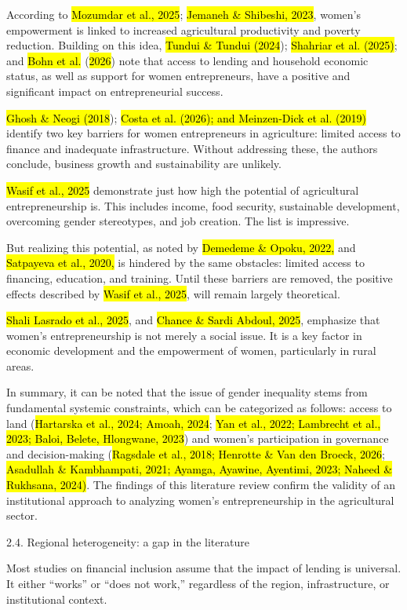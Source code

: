 \documentclass[
]{article}
\begin{document}
According to \hl{Mozumdar et al., 2025}; \hl{Jemaneh \& Shibeshi, 2023},
women's empowerment is linked to increased agricultural productivity and
poverty reduction. Building on this idea, \hl{Tundui \& Tundui (2024});
\hl{Shahriar et al. (2025)}; and \hl{Bohn et al.} (\hl{2026}) note that
access to lending and household economic status, as well as support for
women entrepreneurs, have a positive and significant impact on
entrepreneurial success.

\hl{Ghosh \& Neogi (2018}); \hl{Costa et al. (2026); and Meinzen-Dick et
al. (2019)} identify two key barriers for women entrepreneurs in
agriculture: limited access to finance and inadequate infrastructure.
Without addressing these, the authors conclude, business growth and
sustainability are unlikely.

\hl{Wasif et al., 2025} demonstrate just how high the potential of
agricultural entrepreneurship is. This includes income, food security,
sustainable development, overcoming gender stereotypes, and job
creation. The list is impressive.

But realizing this potential, as noted by \hl{Demedeme \& Opoku, 2022,}
and \hl{Satpayeva et al., 2020,} is hindered by the same obstacles:
limited access to financing, education, and training. Until these
barriers are removed, the positive effects described by \hl{Wasif et
al., 2025}, will remain largely theoretical.

\hl{Shali Lasrado et al., 2025}, and \hl{Chance \& Sardi Abdoul, 2025},
emphasize that women's entrepreneurship is not merely a social issue. It
is a key factor in economic development and the empowerment of women,
particularly in rural areas.

In summary, it can be noted that the issue of gender inequality stems
from fundamental systemic constraints, which can be categorized as
follows: access to land (\hl{Hartarska et al., 2024; Amoah, 2024};
\hl{Yan et al., 2022; Lambrecht et al., 2023; Baloi, Belete, Hlongwane,
2023}) and women's participation in governance and decision-making
(\hl{Ragsdale et al., 2018; Henrotte \& Van den Broeck, 2026};
\hl{Asadullah \& Kambhampati, 2021; Ayamga, Ayawine, Ayentimi, 2023;
Naheed \& Rukhsana, 2024)}. The findings of this literature review
confirm the validity of an institutional approach to analyzing women's
entrepreneurship in the agricultural sector.

2.4. Regional heterogeneity: a gap in the literature

Most studies on financial inclusion assume that the impact of lending is
universal. It either ``works'' or ``does not work,'' regardless of the
region, infrastructure, or institutional context.
\end{document}
